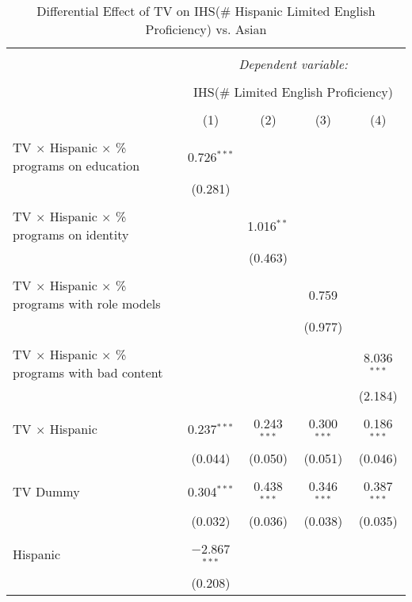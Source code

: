 
\begin{table}[!htbp] \centering 
  \caption{Differential Effect of TV on IHS(\# Hispanic Limited English Proficiency) vs. Asian} 
  \label{} 
\begin{tabular}{@{\extracolsep{-2pt}}lcccc} 
\\[-1.8ex]\hline 
\hline \\[-1.8ex] 
 & \multicolumn{4}{c}{\textit{Dependent variable:}} \\ 
\cline{2-5} 
\\[-1.8ex] & \multicolumn{4}{c}{IHS(\# Limited English Proficiency)} \\ 
\\[-1.8ex] & (1) & (2) & (3) & (4)\\ 
\hline \\[-1.8ex] 
 TV $\times$ Hispanic $\times$ \% programs on education & 0.726$^{***}$ &  &  &  \\ 
  & (0.281) &  &  &  \\ 
  & & & & \\ 
 TV $\times$ Hispanic $\times$ \% programs on identity &  & 1.016$^{**}$ &  &  \\ 
  &  & (0.463) &  &  \\ 
  & & & & \\ 
 TV $\times$ Hispanic $\times$ \% programs with role models &  &  & 0.759 &  \\ 
  &  &  & (0.977) &  \\ 
  & & & & \\ 
 TV $\times$ Hispanic $\times$ \% programs with bad content &  &  &  & 8.036$^{***}$ \\ 
  &  &  &  & (2.184) \\ 
  & & & & \\ 
 TV $\times$ Hispanic & 0.237$^{***}$ & 0.243$^{***}$ & 0.300$^{***}$ & 0.186$^{***}$ \\ 
  & (0.044) & (0.050) & (0.051) & (0.046) \\ 
  & & & & \\ 
 TV Dummy & 0.304$^{***}$ & 0.438$^{***}$ & 0.346$^{***}$ & 0.387$^{***}$ \\ 
  & (0.032) & (0.036) & (0.038) & (0.035) \\ 
  & & & & \\ 
 Hispanic & $-$2.867$^{***}$ &  &  &  \\ 
  & (0.208) &  &  &  \\ 

\end{tabular}
\end{table}
